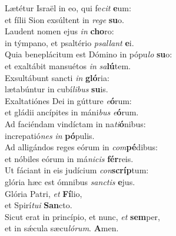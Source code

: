 \evenverse Lætétur Israël in eo, qui fe\textit{cit} \textbf{e}um:~\*\\
\evenverse et fílii Sion exsúltent in \textit{re}\textit{ge} \textbf{su}o.\\
\oddverse Laudent nomen ejus \textit{in} \textbf{cho}ro:~\*\\
\oddverse in týmpano, et psaltério \textit{psal}\textit{lant} \textbf{e}i.\\
\evenverse Quia beneplácitum est Dómino in pópu\textit{lo} \textbf{su}o:~\*\\
\evenverse et exaltábit mansuétos \textit{in} \textit{sa}\textbf{lú}tem.\\
\oddverse Exsultábunt sancti \textit{in} \textbf{gló}ria:~\*\\
\oddverse lætabúntur in cubí\textit{li}\textit{bus} \textbf{su}is.\\
\evenverse Exaltatiónes Dei in gútture \textit{e}\textbf{ó}rum:~\*\\
\evenverse et gládii ancípites in máni\textit{bus} \textit{e}\textbf{ó}rum.\\
\oddverse Ad faciéndam vindíctam in na\textit{ti}\textbf{ó}nibus:~\*\\
\oddverse increpatió\textit{nes} \textit{in} \textbf{pó}pulis.\\
\evenverse Ad alligándos reges eórum in \textit{com}\textbf{pé}dibus:~\*\\
\evenverse et nóbiles eórum in má\textit{ni}\textit{cis} \textbf{fér}reis.\\
\oddverse Ut fáciant in eis judícium \textit{con}\textbf{scríp}tum:~\*\\
\oddverse glória hæc est ómnibus \textit{san}\textit{ctis} \textbf{e}jus.\\
\evenverse Glória Patri, \textit{et} \textbf{Fí}lio,~\*\\
\evenverse et Spirí\textit{tu}\textit{i} \textbf{San}cto.\\
\oddverse Sicut erat in princípio, et nunc, \textit{et} \textbf{sem}per,~\*\\
\oddverse et in sǽcula sæcu\textit{ló}\textit{rum}. \textbf{A}men.\\
